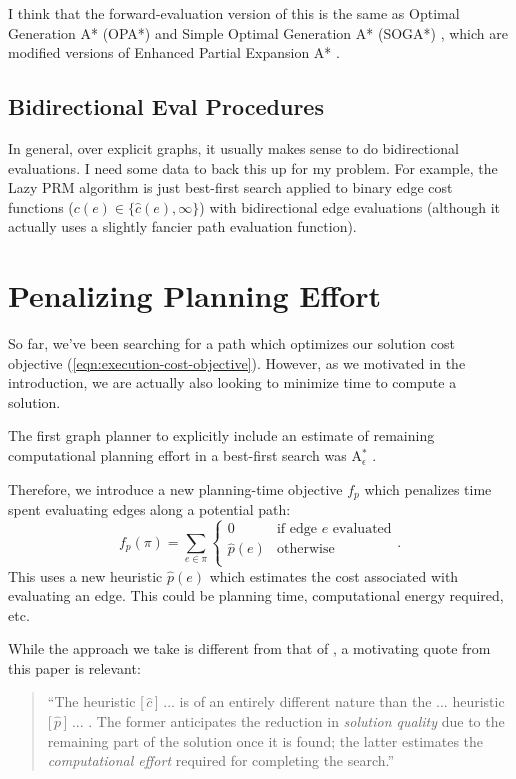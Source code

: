 \documentclass{report}
\begin{document}
I think that the forward-evaluation version of this is the same as
Optimal Generation A* (OPA*) and Simple Optimal Generation A* (SOGA*)
\cite{goldenberg2013epeastar},
which are modified versions of
Enhanced Partial Expansion A* \cite{felner2012epastar}.

\subsection{Bidirectional {\sc Eval} Procedures}

In general, over explicit graphs,
it usually makes sense to do bidirectional evaluations.
I need some data to back this up for my problem.
For example,
the Lazy PRM algorithm \cite{bohlin2000lazyprm}
is just best-first search
applied to binary edge cost functions
($c(e) \in \{ \hat{c}(e), \infty \}$)
with bidirectional edge evaluations
(although it actually uses a slightly fancier path evaluation function).

\section{Penalizing Planning Effort}

So far, we've been searching for a path which optimizes our solution
cost objective (\ref{eqn:execution-cost-objective}).
However, as we motivated in the introduction,
we are actually also looking to minimize time to compute a solution.

The first graph planner to explicitly include an estimate of remaining
computational planning effort in a best-first search
was A$_\epsilon^*$ \cite{pearl1982semiadmissible}.

Therefore, we introduce a new planning-time objective $f_p$
which penalizes time spent evaluating edges along a potential path:
\begin{equation}
   f_p(\pi) = \sum_{e \in \pi} \left\{
   \begin{array}{cl}
      0 & \mbox{if edge } e \mbox{ evaluated}  \\
      \hat{p}(e) & \mbox{otherwise} \\
   \end{array}
   \right.
   .
\end{equation}
This uses a new heuristic $\hat{p}(e)$ which estimates the cost
associated with evaluating an edge.
This could be planning time, computational energy required, etc.

While the approach we take is different from that of
\cite{pearl1982semiadmissible},
a motivating quote from this paper is relevant:
\begin{quote}
``The heuristic [\,$\hat{c}$\,] ... is of an entirely
different nature than the ... heuristic [\,$\hat{p}$\,] ... .
The former anticipates the reduction in \emph{solution quality} due to the
remaining part of the solution once it is found;
the latter estimates the \emph{computational effort}
required for completing the search.''
\end{quote}
\end{document}
